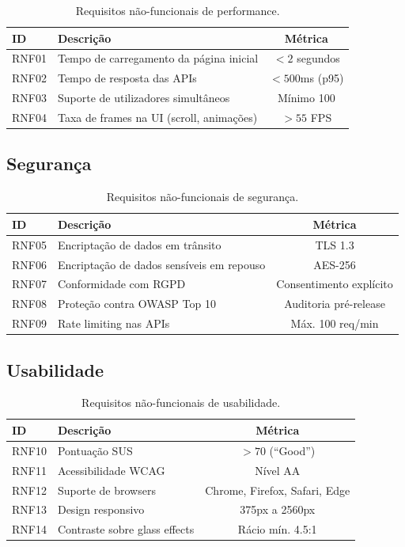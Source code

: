 \begin{table}[H]
\centering
\caption{Requisitos não-funcionais de performance.}
\label{tab:rnf-perf}
\begin{tabularx}{\textwidth}{l X c}
\toprule
\textbf{ID} & \textbf{Descrição} & \textbf{Métrica} \\
\midrule
RNF01 & Tempo de carregamento da página inicial & $< 2$ segundos \\
RNF02 & Tempo de resposta das \ac{API}s & $< 500$ms (p95) \\
RNF03 & Suporte de utilizadores simultâneos & Mínimo 100 \\
RNF04 & Taxa de frames na \ac{UI} (scroll, animações) & $> 55$ FPS \\
\bottomrule
\end{tabularx}
\end{table}

\subsection{Segurança}

\begin{table}[H]
\centering
\caption{Requisitos não-funcionais de segurança.}
\label{tab:rnf-seg}
\begin{tabularx}{\textwidth}{l X c}
\toprule
\textbf{ID} & \textbf{Descrição} & \textbf{Métrica} \\
\midrule
RNF05 & Encriptação de dados em trânsito & \ac{TLS} 1.3 \\
RNF06 & Encriptação de dados sensíveis em repouso & AES-256 \\
RNF07 & Conformidade com \ac{RGPD} & Consentimento explícito \\
RNF08 & Proteção contra \ac{OWASP} Top 10 & Auditoria pré-release \\
RNF09 & Rate limiting nas \ac{API}s & Máx. 100 req/min \\
\bottomrule
\end{tabularx}
\end{table}

\subsection{Usabilidade}

\begin{table}[H]
\centering
\caption{Requisitos não-funcionais de usabilidade.}
\label{tab:rnf-usab}
\begin{tabularx}{\textwidth}{l X c}
\toprule
\textbf{ID} & \textbf{Descrição} & \textbf{Métrica} \\
\midrule
RNF10 & Pontuação \ac{SUS} & $> 70$ (``Good'') \\
RNF11 & Acessibilidade \ac{WCAG} & Nível AA \\
RNF12 & Suporte de browsers & Chrome, Firefox, Safari, Edge \\
RNF13 & Design responsivo & 375px a 2560px \\
RNF14 & Contraste sobre glass effects & Rácio mín. 4.5:1 \\
\bottomrule
\end{tabularx}
\end{table}

